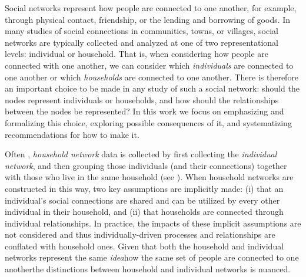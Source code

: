 Social networks represent how people are connected to one another, for example, through physical contact, friendship, or the lending and borrowing of goods. In many studies of social connections in communities, towns, or villages, social networks are typically collected and analyzed at one of two representational levels: individual or household. That is, when considering how people are connected with one another, we can consider which \textit{individuals} are connected to one another or which \textit{households} are connected to one another. There is therefore an important choice to be made in any study of such a social network: should the nodes represent individuals or households, and how should the relationships between the nodes be represented? In this work we focus on emphasizing and formalizing this choice, exploring possible consequences of it, and systematizing recommendations for how to make it.

Often \citep[e.g.,][]{banerjee2013, airoldi2024}, \textit{household network} data is collected by first collecting the \textit{individual network}, and then grouping those individuals (and their connections) together with those who live in the same household (see ). When household networks are constructed in this way, two key assumptions are implicitly made: (i) that an individual's social connections are shared and can be utilized by every other individual in their household, and (ii) that households are connected through individual relationships. In practice, the impacts of these implicit assumptions are not considered and thus individually-driven processes and relationships are conflated with household ones. Given that both the household and individual networks represent the same \textit{idea}\textemdash how the same set of people are connected to one another\textemdash the distinctions between household and individual networks is nuanced. 

